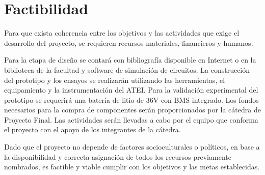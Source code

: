 \section{Factibilidad}

Para que exista coherencia entre los objetivos y las actividades que exige el desarrollo del proyecto,
 se requieren recursos materiales, financieros y humanos. 

Para la etapa de diseño se contará con bibliografía disponible en Internet o en la biblioteca de la facultad y software de simulación de circuitos.
La construcción del prototipo y los ensayos se realizarán utilizando las herramientas, el equipamiento y la instrumentación del ATEI. 
Para la validación experimental del prototipo se requerirá una batería de litio de 36V con BMS integrado. 
Los fondos necesarios para la compra de componentes serán proporcionados por la cátedra de Proyecto Final.
Las actividades serán llevadas a cabo por el equipo que conforma el proyecto con el apoyo de los integrantes de la cátedra.

Dado que el proyecto no depende de factores socioculturales o políticos, en base a la disponibilidad y correcta asignación
de todos los recursos previamente nombrados, es factible y viable cumplir con los objetivos y las metas establecidas. 